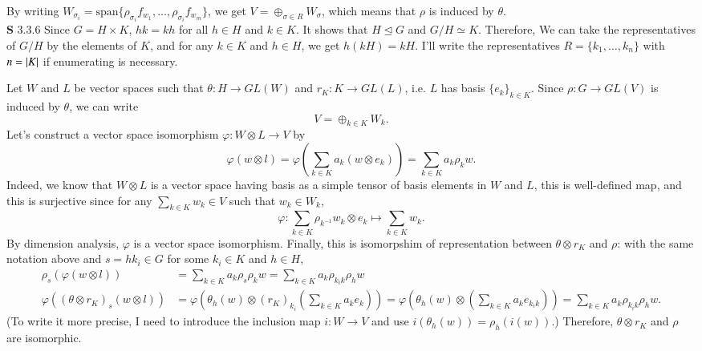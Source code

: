 \documentclass[a4paper, 12pt]{article}
\theoremstyle{Mydefinition}
\theoremstyle{Mytheorem}
\begin{document}
By writing $W_{\sigma_i} = \mathrm{span}\{\rho_{\sigma_i}f_{w_1}, \ldots, \rho_{\sigma_i}f_{w_m}\}$, we get $V = \oplus_{\sigma\in R}W_\sigma$, which means that $\rho$ is induced by $\theta$.\\

\noindent \textbf{S} 3.3.6
Since $G=H\times K$, $hk=kh$ for all $h\in H$ and $k\in K$. It shows that $H \trianglelefteq G$ and $G/H\simeq K$. Therefore, We can take the representatives of $G/H$ by the elements of $K$, and for any $k\in K$ and $h\in H$, we get $h(kH) = kH$. I'll write the representatives $R = \{k_1, \ldots, k_n\}$ with $n=\abs{K}$ if enumerating is necessary.

Let $W$ and $L$ be vector spaces such that $\theta:H\rightarrow GL(W)$ and $r_K:K\rightarrow GL(L)$, i.e. $L$ has basis $\{e_k\}_{k\in K}$. Since $\rho:G\rightarrow GL(V)$ is induced by $\theta$, we can write
\begin{equation}
    V= \oplus_{k\in K}W_k.
\end{equation}
Let's construct a vector space isomorphism $\varphi:W\otimes L\rightarrow V$ by
\begin{equation}
    \varphi(w\otimes l) = \varphi(\sum_{k\in K}a_k(w\otimes e_k)) = \sum_{k\in K}a_k\rho_k w.
\end{equation}
Indeed, we know that $W\otimes L$ is a vector space having basis as a simple tensor of basis elements in $W$ and $L$, this is well-defined map, and this is surjective since for any $\sum_{k\in K}w_k\in V$ such that $w_k\in W_k$,
\begin{equation}
    \varphi:\sum_{k\in K}\rho_{k^{-1}}w_k\otimes e_k\mapsto \sum_{k\in K}w_k.
\end{equation}
By dimension analysis, $\varphi$ is a vector space isomorphism. Finally, this is isomorpshim of representation between $\theta\otimes r_K$ and $\rho$: with the same notation above and $s = hk_i\in G$ for some $k_i\in K$ and $h\in H$,
\begin{equation}
    \begin{split}
        \rho_s(\varphi(w\otimes l)) &=\sum_{k\in K}a_k\rho_s\rho_kw = \sum_{k\in K} a_k\rho_{k_ik}\rho_hw\\
        \varphi\left(\left(\theta\otimes r_K\right)_s(w\otimes l)\right) &= \varphi\left(\theta_h(w)\otimes (r_K)_{k_i}\left(\sum_{k\in K}a_ke_k\right)\right) = \varphi\left(\theta_h(w)\otimes \left(\sum_{k\in K}a_ke_{k_ik}\right)\right) = \sum_{k\in K}a_k\rho_{k_ik}\rho_hw.
    \end{split}
\end{equation}
(To write it more precise, I need to introduce the inclusion map $i:W\rightarrow V$ and use $i(\theta_h(w)) = \rho_h(i(w))$.) Therefore, $\theta\otimes r_K$ and $\rho$ are isomorphic.
\end{document}
